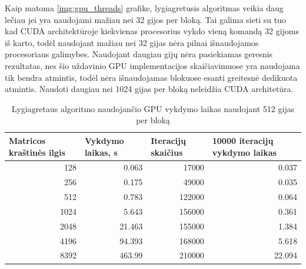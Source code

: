 \documentclass{VUMIFPSbakalaurinis}
\begin{document}
Kaip matoma \ref{img:gpu_threads} grafike, lygiagretusis algoritmas veikia daug lečiau jei yra naudojami mažiau nei 32 gijos per bloką. 
Tai galima sieti su tuo kad CUDA architektūroje kiekvienas procesorius vykdo vieną komandą 32 gijoms iš karto, todėl naudojant mažiau nei 32 gijas nėra pilnai išnaudojamos procesoriaus galimybes.
Naudojant daugiau gijų nėra pasiekiamas geresnis rezultatas, nes šio uždavinio GPU implementacijos skaičiavimuose yra naudojama tik bendra atmintis, todėl nėra išnaudojamas blokuose esanti greitesnė dedikuota atmintis. 
Naudoti daugiau nei 1024 gijas per bloką neleidžia CUDA architetūra.


\begin{table}[]
    \begin{tabular}{|r|r|r|r|}
        \hline
        \multicolumn{1}{|l|}{Matricos kraštinės ilgis} & \multicolumn{1}{l|}{Vykdymo laikas, s} & \multicolumn{1}{l|}{Iteracijų skaičius} & \multicolumn{1}{l|}{10000 iteracijų vykdymo laikas} \\ \hline
        128                                            & 0.063                                  & 17000                                   & 0.037                                               \\ \hline
        256                                            & 0.175                                  & 49000                                   & 0.035                                               \\ \hline
        512                                            & 0.783                                  & 122000                                  & 0.064                                               \\ \hline
        1024                                           & 5.643                                  & 156000                                  & 0.361                                               \\ \hline
        2048                                           & 21.463                                 & 155000                                  & 1.384                                               \\ \hline
        4196                                           & 94.393                                 & 168000                                  & 5.618                                               \\ \hline
        8392                                           & 463.99                                 & 210000                                  & 22.094                                              \\ \hline
    \end{tabular}
    \caption{Lygiagretaus algoritmo naudojančio GPU vykdymo laikas naudojant 512 gijas per bloką}
    \label{table:gpu_dim}
\end{table}
\end{document}
